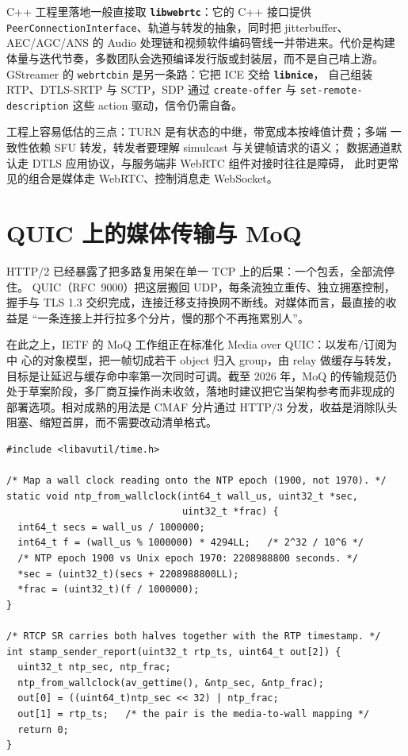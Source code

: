 \documentclass[12pt,a4paper,fontset=fandol]{ctexbook}
\newcommand{\Tp}[1]{\texttt{#1}}
\newcommand{\Bk}{\discretionary{}{}{}}
\newcommand{\Lib}[1]{\textbf{\texttt{#1}}}
\newcommand{\Lang}[1]{\textsf{#1}}
\newcommand{\CPP}{\Lang{C++}}
\newcommand{\DomAud}{\Lang{Audio}}
\begin{document}
\CPP{} 工程里落地一般直接取 \Lib{libwebrtc}：它的 C++ 接口提供
\Tp{Peer{\Bk}Connection{\Bk}Interface}、轨道与转发的抽象，同时把 jitterbuffer、
AEC/AGC/ANS 的 \DomAud{} 处理链和视频软件编码管线一并带进来。代价是构建
体量与迭代节奏，多数团队会选预编译发行版或封装层，而不是自己啃上游。
GStreamer 的 \Tp{webrtcbin} 是另一条路：它把 ICE 交给 \Lib{libnice}，
自己组装 RTP、DTLS-SRTP 与 SCTP，SDP 通过 \Tp{create-{\Bk}offer} 与
\Tp{set-{\Bk}remote-{\Bk}description} 这些 action 驱动，信令仍需自备。

工程上容易低估的三点：TURN 是有状态的中继，带宽成本按峰值计费；多端
一致性依赖 SFU 转发，转发者要理解 simulcast 与关键帧请求的语义；
数据通道默认走 DTLS 应用协议，与服务端非 WebRTC 组件对接时往往是障碍，
此时更常见的组合是媒体走 WebRTC、控制消息走 WebSocket。

\section{QUIC 上的媒体传输与 MoQ}

HTTP/2 已经暴露了把多路复用架在单一 TCP 上的后果：一个包丢，全部流停住。
QUIC（RFC~9000）把这层搬回 UDP，每条流独立重传、独立拥塞控制，握手与
TLS 1.3 交织完成，连接迁移支持换网不断线。对媒体而言，最直接的收益是
``一条连接上并行拉多个分片，慢的那个不再拖累别人''。

在此之上，IETF 的 MoQ 工作组正在标准化 Media over QUIC：以发布/订阅为中
心的对象模型，把一帧切成若干 object 归入 group，由 relay 做缓存与转发，
目标是让延迟与缓存命中率第一次同时可调。截至 2026 年，MoQ 的传输规范仍
处于草案阶段，多厂商互操作尚未收敛，落地时建议把它当架构参考而非现成的
部署选项。相对成熟的用法是 CMAF 分片通过 HTTP/3 分发，收益是消除队头
阻塞、缩短首屏，而不需要改动清单格式。

\begin{lstlisting}[style=cstyle,caption={用 RTCP 发送报告把 RTP 时间戳钉到墙钟},label={lst:ch11-clock}]
#include <libavutil/time.h>

/* Map a wall clock reading onto the NTP epoch (1900, not 1970). */
static void ntp_from_wallclock(int64_t wall_us, uint32_t *sec,
                               uint32_t *frac) {
  int64_t secs = wall_us / 1000000;
  int64_t f = (wall_us % 1000000) * 4294LL;   /* 2^32 / 10^6 */
  /* NTP epoch 1900 vs Unix epoch 1970: 2208988800 seconds. */
  *sec = (uint32_t)(secs + 2208988800LL);
  *frac = (uint32_t)(f / 1000000);
}

/* RTCP SR carries both halves together with the RTP timestamp. */
int stamp_sender_report(uint32_t rtp_ts, uint64_t out[2]) {
  uint32_t ntp_sec, ntp_frac;
  ntp_from_wallclock(av_gettime(), &ntp_sec, &ntp_frac);
  out[0] = ((uint64_t)ntp_sec << 32) | ntp_frac;
  out[1] = rtp_ts;   /* the pair is the media-to-wall mapping */
  return 0;
}
\end{lstlisting}
\end{document}
